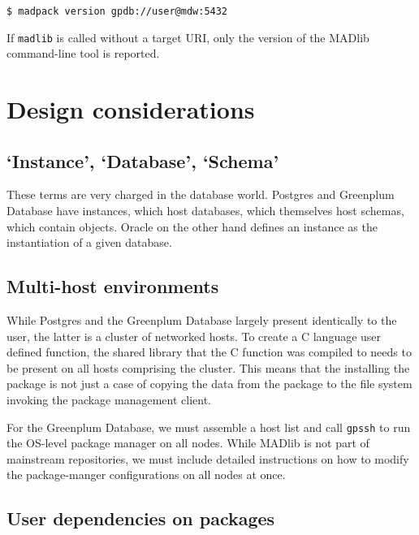 \documentclass[11pt]{article}
\begin{document}
{		\begin{lstlisting}
$ madpack version gpdb://user@mdw:5432
		\end{lstlisting}
		
		If \texttt{madlib} is called without a target URI, only the version of the MADlib command-line tool is reported.

\ifx\pdfoutput\undefined %
\else
{}
\fi

\section{Design considerations}
	
	\subsection{`Instance', `Database', `Schema'}

	These terms are very charged in the database world. Postgres and Greenplum
	Database have instances, which host databases, which themselves host
	schemas, which contain objects. Oracle on the other hand defines an instance
	as the instantiation of a given database.

	\subsection{Multi-host environments}

	While Postgres and the Greenplum Database largely present identically to the
	user, the latter is a cluster of networked hosts. To create a C language
	user defined function, the shared library that the C function was compiled
	to needs to be present on all hosts comprising the cluster. This means that
	the installing the package is not just a case of copying the data from the
	package to the file system invoking the package management client.

	For the Greenplum Database, we must assemble a host list and
	call \texttt{gpssh} to run the OS-level package manager on all nodes. While MADlib is not part of mainstream repositories, we must include detailed instructions on how to modify the package-manger configurations on all nodes at once.

	\subsection{User dependencies on packages}

}
\end{document}
